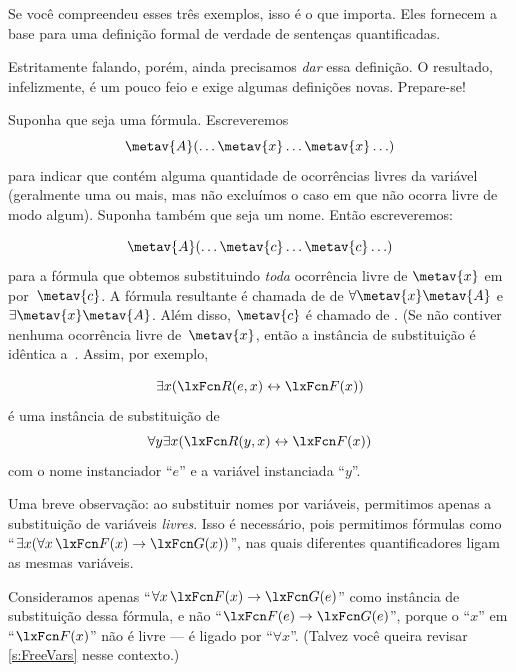Se você compreendeu esses três exemplos, isso é o que importa. Eles fornecem a base para uma definição formal de verdade de sentenças quantificadas.

Estritamente falando, porém, ainda precisamos \emph{dar} essa definição. O resultado, infelizmente, é um pouco feio e exige algumas definições novas. Prepare-se!

Suponha que  seja uma fórmula. Escreveremos
$$\metav{A}(\ldots \metav{x} \ldots \metav{x} \ldots)$$ para indicar
que  contém alguma quantidade de ocorrências livres da variável~ (geralmente uma ou mais, mas não excluímos o caso em que  não ocorra livre de modo algum). Suponha também que  seja um nome. Então escreveremos:



$$\metav{A}(\ldots \metav{c} \ldots \metav{c} \ldots)$$
para a fórmula que obtemos substituindo \emph{toda} ocorrência livre de $\metav{x}$ em  por~$\metav{c}$. A fórmula resultante é chamada de  de $\forall \metav{x}\metav{A}$ e $\exists\metav{x}\metav{A}$. Além disso, $\metav{c}$ é chamado de . (Se  não contiver nenhuma ocorrência livre de~$\metav{x}$, então a instância de substituição é idêntica a~. Assim, por exemplo,






	$$\exists x (\atom{R}{e,x} \eiff \atom{F}{x})$$
é uma instância de substituição de
	$$\forall y \exists x (\atom{R}{y,x} \eiff \atom{F}{x})$$
com o nome instanciador \textquotedblleft $e$\textquotedblright{} e a variável instanciada \textquotedblleft $y$\textquotedblright{}.


Uma breve observação: ao substituir nomes por variáveis, permitimos apenas a substituição de variáveis \emph{livres}. Isso é necessário, pois permitimos fórmulas como \textquotedblleft $\exists x(\forall x\,\atom{F}{x} \eif \atom{G}{x})$\textquotedblright{}, nas quais diferentes quantificadores ligam as mesmas variáveis.



Consideramos apenas \textquotedblleft $\forall x\,\atom{F}{x} \eif \atom{G}{e}$\textquotedblright{} como instância de substituição dessa fórmula, e não \textquotedblleft $\atom{F}{e} \eif \atom{G}{e}$\textquotedblright{}, porque o \textquotedblleft $x$\textquotedblright{} em \textquotedblleft $\atom{F}{x}$\textquotedblright{} não é livre — é ligado por \textquotedblleft $\forall x$\textquotedblright{}. (Talvez você queira revisar \cref{s:FreeVars} nesse contexto.)





